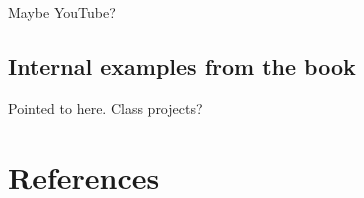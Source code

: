 \documentclass[
  letterpaper,
]{book}
\begin{document}
Maybe YouTube?

\section{Internal examples from the
book}\label{internal-examples-from-the-book}

Pointed to here. Class projects?


\chapter*{References}\label{references-1}


\label{refs}
\end{document}
